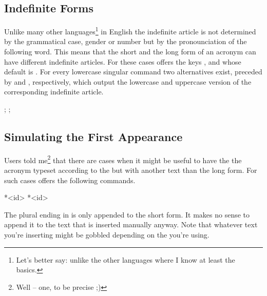 \documentclass[DIV10,toc=index,toc=bib,hyperfootnotes=false]{cnpkgdoc}
\makeatletter
\providecommand*\sinceversion[1]{%
  \@bsphack
  \marginnote{%
    \footnotesize\sffamily\RaggedRight
    \textcolor{black!75}{Introduced in version~#1}}%
  \@esphack}
\makeatother
\begin{document}
\subsection{Indefinite Forms}
\noindent\sinceversion{1.2}%
Unlike many other languages\footnote{Let's better say: unlike the other
languages where I know at least the basics.} in English the indefinite article
is not determined by the grammatical case, gender or number but by the
pronounciation of the following word. This means that the short and the long
form of an acronym can have different indefinite articles. For these cases \acro
offers the keys ,  and
 whose default is . For every lowercase singular
command two alternatives exist, preceded by  and , respectively,
which output the lowercase and uppercase version of the corresponding indefinite
article.

\begin{beispiel}
 ; ; 
\end{beispiel}

\subsection{Simulating the First Appearance}
\noindent\sinceversion{1.2}%
Users told me\footnote{Well -- one, to be precise ;)} that there are cases when it
might be useful to have the the acronym typeset according to the 
but with another text than the long form. For such cases \acro offers the
following commands.
\begin{beschreibung}
 *{<id>}
 *{<id>}
\end{beschreibung}

\begin{beispiel}
\end{beispiel}

The plural ending in  is only appended to the short form. It makes
no sense to append it to the text that is inserted manually anyway. Note that
whatever text you're inserting might be gobbled depending on the 
you're using.
\end{document}
